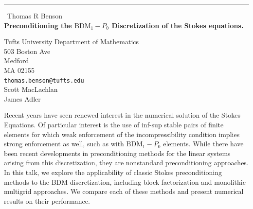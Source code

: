 \documentclass{report}
\begin{document}
\begin{center}
\rule{6in}{1pt} \
{\large Thomas R Benson \\
{\bf Preconditioning the $\text{BDM}_1-P_0$ Discretization of the Stokes equations.}}

Tufts University Department of Mathematics \\ 503 Boston Ave \\ Medford \\ MA 02155
\\
{\tt thomas.benson@tufts.edu}\\
Scott MacLachlan\\
James Adler\end{center}

Recent years have seen renewed interest in the numerical solution of the
Stokes Equations. Of particular interest is the use of inf-sup stable
pairs of finite elements for which weak enforcement of the
incompressibility condition implies strong enforcement as well, such as
with $\text{BDM}_1-P_0$ elements. While there have been recent
developments in preconditioning methods for the linear systems arising
from this discretization, they are nonstandard preconditioning
approaches. In this talk, we explore the applicability of classic Stokes
preconditioning methods to the BDM discretization, including
block-factorization and monolithic multigrid approaches. We compare each
of these methods and present numerical results on their performance.
\end{document}
